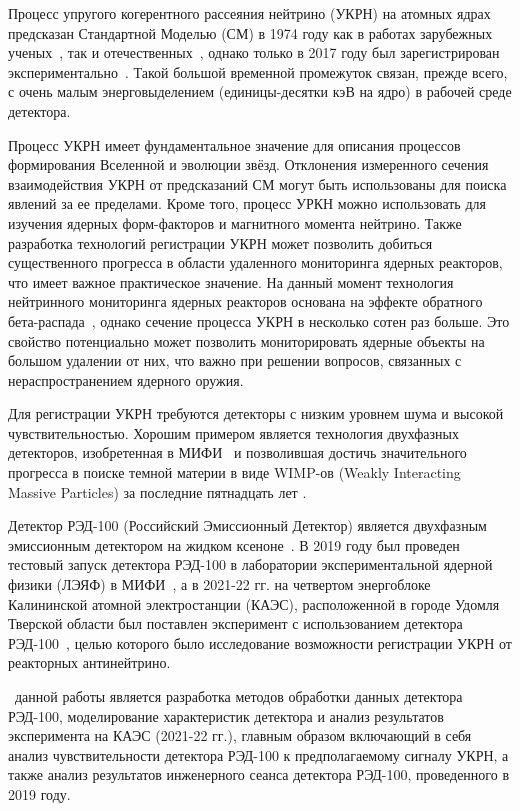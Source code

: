 {\actuality} Процесс упругого когерентного рассеяния нейтрино (УКРН) на атомных ядрах предсказан Стандартной Моделью (СМ) в 1974 году как в работах зарубежных ученых~\cite{Freedman}, так и отечественных~\cite{Kopeliovich:1974mv}, однако только в 2017 году был зарегистрирован экспериментально~\cite{COHERENT:2017ipa}. Такой большой временной промежуток связан, прежде всего, с очень малым энерговыделением (единицы-десятки кэВ на ядро) в рабочей среде детектора.
\par Процесс УКРН имеет фундаментальное значение для описания процессов формирования Вселенной и эволюции звёзд. Отклонения измеренного сечения взаимодействия УКРН от предсказаний СМ могут быть использованы для поиска явлений за ее пределами. Кроме того, процесс УРКН можно использовать для изучения ядерных форм-факторов и магнитного момента нейтрино. Также разработка технологий регистрации УКРН может позволить добиться существенного прогресса в области удаленного мониторинга ядерных реакторов, что имеет важное практическое значение. На данный момент технология нейтринного мониторинга ядерных реакторов основана на эффекте обратного бета-распада~\cite{Rusov}, однако сечение процесса УКРН в несколько сотен раз больше. Это свойство потенциально может позволить мониторировать ядерные объекты на большом удалении от них, что важно при решении вопросов, связанных с нераспространением ядерного оружия.
\par Для регистрации УКРН требуются детекторы с низким уровнем шума и высокой чувствительностью. Хорошим примером является технология двухфазных детекторов, изобретенная в МИФИ~\cite{Dolgoshein} и позволившая достичь значительного прогресса в поиске темной материи в виде WIMP-ов (Weakly Interacting Massive Particles) за последние пятнадцать лет \cite{BOLOZDYNYA2015405}. 
\par Детектор РЭД-100 (Российский Эмиссионный Детектор) является двухфазным эмиссионным детектором на жидком ксеноне~\cite{Akimov2017}. В 2019 году был проведен тестовый запуск детектора РЭД-100 в лаборатории экспериментальной ядерной физики (ЛЭЯФ) в МИФИ~\cite{RED100_2019}, а в 2021-22 гг. на четвертом энергоблоке Калининской атомной электростанции (КАЭС), расположенной в городе Удомля Тверской области был поставлен эксперимент с использованием детектора РЭД-100~\cite{The_RED100_Experiment}, целью которого было исследование возможности регистрации УКРН от реакторных антинейтрино.

 \aim~данной работы является разработка методов обработки данных детектора РЭД-100, моделирование характеристик детектора и анализ результатов эксперимента на КАЭС (2021-22 гг.), главным образом включающий в себя анализ чувствительности детектора РЭД-100 к предполагаемому сигналу УКРН, а также анализ результатов инженерного сеанса детектора РЭД-100, проведенного в 2019 году.

